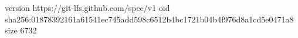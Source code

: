 version https://git-lfs.github.com/spec/v1
oid sha256:01878392161a61541ec745add598c6512b4bc1721b04b4f976d8a1cd5e0471a8
size 6732

